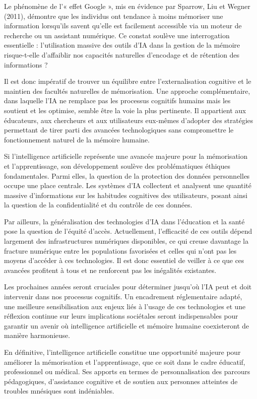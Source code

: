 \documentclass[11pt,a4paper]{report}
\begin{document}
Le phénomène de l’« effet Google », mis en évidence par Sparrow, Liu et Wegner (2011), démontre que les individus ont tendance à moins mémoriser une information lorsqu’ils savent qu’elle est facilement accessible via un moteur de recherche ou un assistant numérique. Ce constat soulève une interrogation essentielle : l’utilisation massive des outils d’IA dans la gestion de la mémoire risque-t-elle d’affaiblir nos capacités naturelles d’encodage et de rétention des informations ?

Il est donc impératif de trouver un équilibre entre l’externalisation cognitive et le maintien des facultés naturelles de mémorisation. Une approche complémentaire, dans laquelle l’IA ne remplace pas les processus cognitifs humains mais les soutient et les optimise, semble être la voie la plus pertinente. Il appartient aux éducateurs, aux chercheurs et aux utilisateurs eux-mêmes d’adopter des stratégies permettant de tirer parti des avancées technologiques sans compromettre le fonctionnement naturel de la mémoire humaine.

Si l’intelligence artificielle représente une avancée majeure pour la mémorisation et l’apprentissage, son développement soulève des problématiques éthiques fondamentales. Parmi elles, la question de la protection des données personnelles occupe une place centrale. Les systèmes d’IA collectent et analysent une quantité massive d’informations sur les habitudes cognitives des utilisateurs, posant ainsi la question de la confidentialité et du contrôle de ces données.

Par ailleurs, la généralisation des technologies d’IA dans l’éducation et la santé pose la question de l’équité d’accès. Actuellement, l’efficacité de ces outils dépend largement des infrastructures numériques disponibles, ce qui creuse davantage la fracture numérique entre les populations favorisées et celles qui n’ont pas les moyens d’accéder à ces technologies. Il est donc essentiel de veiller à ce que ces avancées profitent à tous et ne renforcent pas les inégalités existantes.

Les prochaines années seront cruciales pour déterminer jusqu’où l’IA peut et doit intervenir dans nos processus cognitifs. Un encadrement réglementaire adapté, une meilleure sensibilisation aux enjeux liés à l’usage de ces technologies et une réflexion continue sur leurs implications sociétales seront indispensables pour garantir un avenir où intelligence artificielle et mémoire humaine coexisteront de manière harmonieuse.

En définitive, l’intelligence artificielle constitue une opportunité majeure pour améliorer la mémorisation et l’apprentissage, que ce soit dans le cadre éducatif, professionnel ou médical. Ses apports en termes de personnalisation des parcours pédagogiques, d’assistance cognitive et de soutien aux personnes atteintes de troubles mnésiques sont indéniables.
\end{document}
